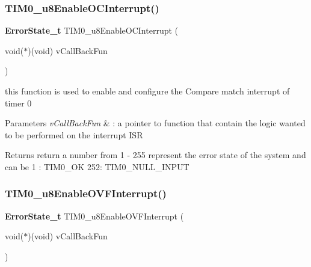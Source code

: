 \mbox{\label{_t_i_m_e_r0_8c_a80bbcb7217a1f9389e1f73d39b3b04d3}} 
\subsubsection{T\+I\+M0\+\_\+u8\+Enable\+O\+C\+Interrupt()}
{\footnotesize\ttfamily \textbf{ Error\+State\+\_\+t} T\+I\+M0\+\_\+u8\+Enable\+O\+C\+Interrupt (\begin{DoxyParamCaption}\item[{void($\ast$)(void)}]{v\+Call\+Back\+Fun }\end{DoxyParamCaption})}



this function is used to enable and configure the Compare match interrupt of timer 0 


\begin{DoxyParams}{Parameters}
{\em v\+Call\+Back\+Fun} & \+: a pointer to function that contain the logic wanted to be performed on the interrupt I\+SR \\
\hline
\end{DoxyParams}
\begin{DoxyReturn}{Returns}
return a number from 1 -\/ 255 represent the error state of the system and can be 1 \+: T\+I\+M0\+\_\+\+OK 252\+: T\+I\+M0\+\_\+\+N\+U\+L\+L\+\_\+\+I\+N\+P\+UT 
\end{DoxyReturn}
\mbox{\label{_t_i_m_e_r0_8c_a1d94b9fccfdcbb336ed7f975cc947730}} 
\subsubsection{T\+I\+M0\+\_\+u8\+Enable\+O\+V\+F\+Interrupt()}
{\footnotesize\ttfamily \textbf{ Error\+State\+\_\+t} T\+I\+M0\+\_\+u8\+Enable\+O\+V\+F\+Interrupt (\begin{DoxyParamCaption}\item[{void($\ast$)(void)}]{v\+Call\+Back\+Fun }\end{DoxyParamCaption})}



